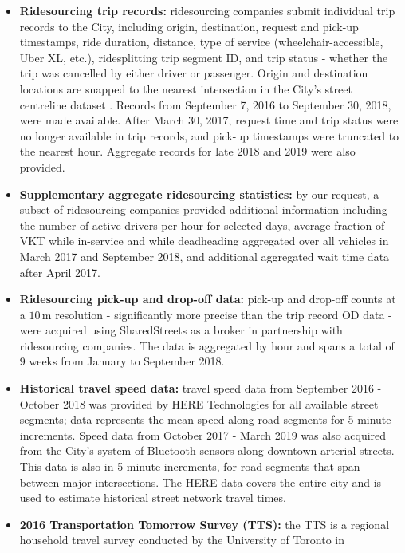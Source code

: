 \documentclass[]{trbunofficial_bdit_final}
\begin{document}
\begin{itemize}
\item
  \textbf{Ridesourcing trip records:} ridesourcing companies submit individual
  trip records to the City, including origin, destination, request and pick-up
  timestamps, ride duration, distance, type of service (wheelchair-accessible,
  Uber XL, etc.), ridesplitting trip segment ID, and trip status - whether
  the trip was cancelled by either driver or passenger. Origin and
  destination locations are snapped to the nearest intersection in the City's
  street centreline dataset \cite{centrelinexsection}. Records from September 7, 2016 to September 30,
  2018, were made available. After March 30, 2017, request time and trip status were no longer available in
  trip records, and pick-up timestamps were truncated to
  the nearest hour. Aggregate records for late 2018 and
  2019 were also provided.
\item
  \textbf{Supplementary aggregate ridesourcing statistics:} by our request, a
  subset of ridesourcing companies provided additional information including
  the number of active drivers per hour for selected days, average fraction
  of VKT while in-service and while deadheading aggregated over all vehicles
  in March 2017 and September 2018, and additional aggregated wait time data
  after April 2017.
\item
  \textbf{Ridesourcing pick-up and drop-off data:} pick-up and drop-off counts at
  a \(10\,\mathrm{m}\) resolution - significantly more precise than the trip
  record OD data - were acquired using SharedStreets \cite{sharedstreetsactivity} as a
  broker in partnership with ridesourcing companies. The data is aggregated
  by hour and spans a total of 9 weeks from January to September 2018.
\item
  \textbf{Historical travel speed data:} travel speed data from September 2016
  - October 2018 was provided by HERE Technologies for all available
  street segments; data represents the mean speed along road segments for
  5-minute increments. Speed data from October 2017 - March 2019 was also
  acquired from the City's system of Bluetooth sensors along downtown
  arterial streets. This data is also in 5-minute increments, for road
  segments that span between major intersections. The HERE data covers the
  entire city and is used to estimate historical street network travel times.
\item
  \textbf{2016 Transportation Tomorrow Survey (TTS):} the TTS is a regional
  household travel survey conducted by the University of Toronto in

\end{itemize}
\end{document}
